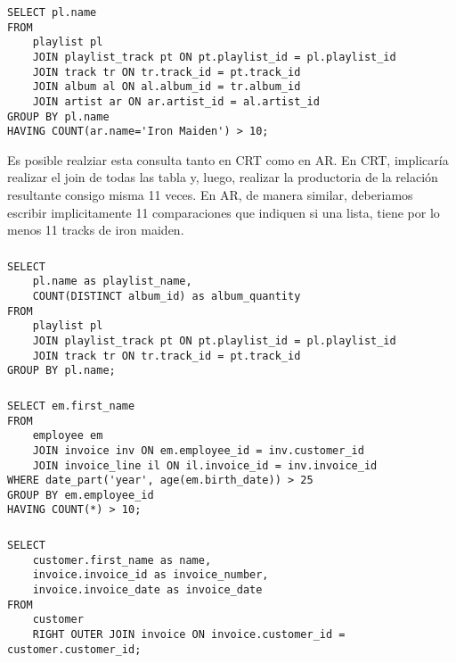 \subsubsection{}
\begin{verbatim}
SELECT pl.name
FROM
	playlist pl
	JOIN playlist_track pt ON pt.playlist_id = pl.playlist_id
	JOIN track tr ON tr.track_id = pt.track_id
	JOIN album al ON al.album_id = tr.album_id
	JOIN artist ar ON ar.artist_id = al.artist_id
GROUP BY pl.name
HAVING COUNT(ar.name='Iron Maiden') > 10;
\end{verbatim}

Es posible realziar esta consulta tanto en CRT como en AR. En CRT, implicaría realizar el join de todas las tabla y, luego, realizar la productoria de la relación resultante consigo misma 11 veces. En AR, de manera similar, deberiamos escribir implicitamente 11 comparaciones que indiquen si una lista, tiene por lo menos 11 tracks de iron maiden.

\subsubsection{}
\begin{verbatim}
SELECT
	pl.name as playlist_name,
	COUNT(DISTINCT album_id) as album_quantity
FROM
	playlist pl
	JOIN playlist_track pt ON pt.playlist_id = pl.playlist_id
	JOIN track tr ON tr.track_id = pt.track_id
GROUP BY pl.name;
\end{verbatim}

\subsubsection{}
\begin{verbatim}
SELECT em.first_name
FROM
	employee em
	JOIN invoice inv ON em.employee_id = inv.customer_id
	JOIN invoice_line il ON il.invoice_id = inv.invoice_id
WHERE date_part('year', age(em.birth_date)) > 25
GROUP BY em.employee_id
HAVING COUNT(*) > 10;
\end{verbatim}

\subsubsection{}
\begin{verbatim}
SELECT
	customer.first_name as name,
	invoice.invoice_id as invoice_number,
	invoice.invoice_date as invoice_date
FROM
	customer
	RIGHT OUTER JOIN invoice ON invoice.customer_id = customer.customer_id;
\end{verbatim}

